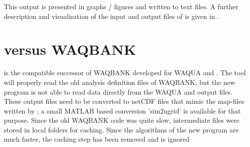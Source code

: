 This output is presented in graphs / figures and written to text files.
A further description and visualisation of the input and output files of \dfastbe is given in .

\section{\dfastbe versus WAQBANK}

\dfastbe is the \dflowfm compatible successor of WAQBANK developed for WAQUA and \dflow. The \dfastbe  tool will properly read the old analysis definition files of WAQBANK, but the new program is not able to read data directly from the WAQUA and \dflow output files.
These output files need to be converted to netCDF files that mimic the map-files written by \dflowfm; a small MATLAB based conversion 'sim2ugrid' is available for that purpose.
Since the old WAQBANK code was quite slow, intermediate files were stored in local folders for caching.
Since the algorithms of the new \dfastbe program are much faster, the caching step has been removed and  is ignored
